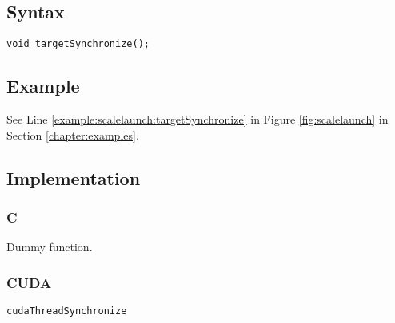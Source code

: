 \subsection{Syntax}
\begin{verbatim}
void targetSynchronize();
\end{verbatim}

\subsection{Example}
See Line \ref{example:scalelaunch:targetSynchronize} in Figure \ref{fig:scalelaunch} in Section \ref{chapter:examples}.
\subsection{Implementation}
\subsubsection{C}
Dummy function.
\subsubsection{CUDA}
\verb+cudaThreadSynchronize+








